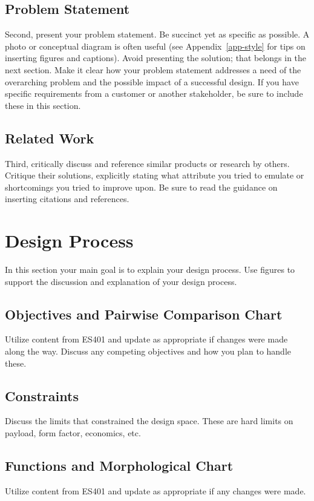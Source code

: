 \documentclass{wsecapstone}
\begin{document}
\subsection{Problem Statement}
Second, present your problem statement.   Be succinct yet as specific as possible.  A photo or conceptual diagram is often useful (see Appendix~\ref{app-style} for tips on inserting figures and captions).   Avoid presenting the solution; that belongs in the next section.  Make it clear how your problem statement addresses a need of the overarching problem and the possible impact of a successful design.  If you have specific requirements from a customer or another stakeholder, be sure to include these in this section.

\subsection{Related Work}
Third, critically discuss and reference similar products or research by others.  Critique their solutions, explicitly stating what attribute you tried to emulate or shortcomings you tried to improve upon.  Be sure to read the guidance on inserting citations and references.





\section{Design Process}
In this section your main goal is to explain your design process. Use figures to support the discussion and explanation of your design process.
 
\subsection{Objectives and Pairwise Comparison Chart}
Utilize content from ES401 and update as appropriate if changes were made along the way. Discuss any competing objectives and how you plan to handle these.

\subsection{Constraints}
Discuss the limits that constrained the design space. These are hard limits on payload, form factor, economics, etc. 

\subsection{Functions and Morphological Chart}
Utilize content from ES401 and update as appropriate if any changes were made. 
\end{document}

